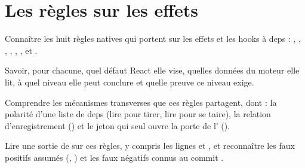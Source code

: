 \chapter{Les règles sur les effets}
\label{chap:regles-effets}

\begin{objectifs}
  \item Connaître les huit règles natives qui portent sur les effets et les hooks à deps : , , , , , ,  et .
  \item Savoir, pour chacune, quel défaut React elle vise, quelles données du moteur elle lit, à quel niveau elle peut conclure et quelle preuve ce niveau exige.
  \item Comprendre les mécanismes transverses que ces règles partagent, dont : la polarité d'une liste de deps (lire pour tirer, lire pour se taire), la relation d'enregistrement  () et le jeton  qui seul ouvre la porte de l'\Error{} ().
  \item Lire une sortie de \reactant{} sur ces règles, y compris les lignes  et , et reconnaître les faux positifs assumés (, ) et les faux négatifs connus au commit \snapshotCommit.
\end{objectifs}


